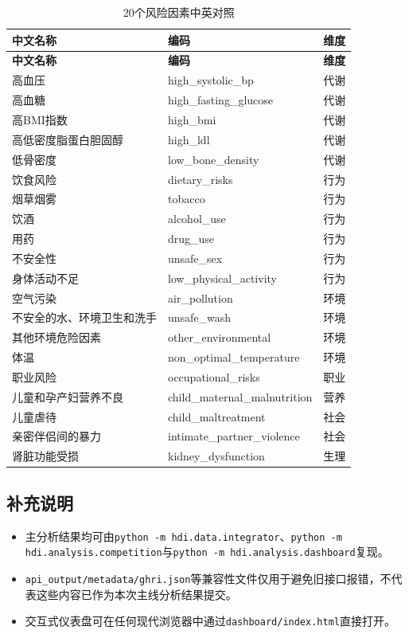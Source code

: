 \documentclass[12pt,a4paper]{ctexart}
\begin{document}
\begin{longtable}{p{6cm}ll}
\caption{20个风险因素中英对照} \label{tab:risk-map} \\
\toprule
\textbf{中文名称} & \textbf{编码} & \textbf{维度} \\
\midrule
\endfirsthead
\toprule
\textbf{中文名称} & \textbf{编码} & \textbf{维度} \\
\midrule
\endhead
\midrule
\endfoot
\bottomrule
\endlastfoot
高血压 & high\_systolic\_bp & 代谢 \\
高血糖 & high\_fasting\_glucose & 代谢 \\
高BMI指数 & high\_bmi & 代谢 \\
高低密度脂蛋白胆固醇 & high\_ldl & 代谢 \\
低骨密度 & low\_bone\_density & 代谢 \\
饮食风险 & dietary\_risks & 行为 \\
烟草烟雾 & tobacco & 行为 \\
饮酒 & alcohol\_use & 行为 \\
用药 & drug\_use & 行为 \\
不安全性 & unsafe\_sex & 行为 \\
身体活动不足 & low\_physical\_activity & 行为 \\
空气污染 & air\_pollution & 环境 \\
不安全的水、环境卫生和洗手 & unsafe\_wash & 环境 \\
其他环境危险因素 & other\_environmental & 环境 \\
体温 & non\_optimal\_temperature & 环境 \\
职业风险 & occupational\_risks & 职业 \\
儿童和孕产妇营养不良 & child\_maternal\_malnutrition & 营养 \\
儿童虐待 & child\_maltreatment & 社会 \\
亲密伴侣间的暴力 & intimate\_partner\_violence & 社会 \\
肾脏功能受损 & kidney\_dysfunction & 生理 \\
\end{longtable}

\subsection{补充说明}

\begin{itemize}[leftmargin=1.5em]
    \item 主分析结果均可由\texttt{python -m hdi.data.integrator}、\texttt{python -m hdi.analysis.competition}与\texttt{python -m hdi.analysis.dashboard}复现。
    \item \texttt{api\_output/metadata/ghri.json}等兼容性文件仅用于避免旧接口报错，不代表这些内容已作为本次主线分析结果提交。
    \item 交互式仪表盘可在任何现代浏览器中通过\texttt{dashboard/index.html}直接打开。
\end{itemize}
\end{document}
